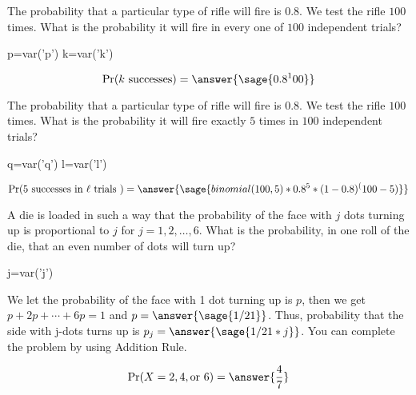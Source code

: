 \documentclass{ximera}
\begin{document}
\hspace{1cm}

\begin{problem}
The probability that a particular type of rifle will fire is $0.8$. We test the rifle $100$ times.
What is the probability it will fire in every one of $100$ independent trials? 

\begin{explanation}
\begin{sagesilent}
p=var('p')
k=var('k')
\end{sagesilent}
\begin{equation*} 
\Pr(k \text{ successes} ) = \answer{\sage{0.8^100}}
\end{equation*}

\end{explanation}
\end{problem}


\begin{problem}
The probability that a particular type of rifle will fire is $0.8$. We test the rifle $100$ times.
What is the probability it will fire exactly $5$ times in $100$ independent trials? 

\begin{explanation}
\begin{sagesilent}
q=var('q')
l=var('l')
\end{sagesilent}
\begin{equation*} 
\Pr(5 \text{ successes in  } \ell \text{ trials } ) = \answer{\sage{binomial(100,5)*0.8^5*(1-0.8)^(100-5)}} 
\end{equation*}
\end{explanation}
\end{problem}



\begin{problem}
A die is loaded in such a way that the probability of the face with $j$ dots turning up is proportional to $j$ for $j = 1,2, \ldots,6$. What is the probability, in one roll of the die, that an even number of dots will turn up? 
\begin{hint}
\begin{sagesilent}
j=var('j')
\end{sagesilent}
We let the probability of the face with 1 dot turning up is $p$,
then we get $p+2p+\cdots+6p=1$ and $p=\answer{\sage{1/21}}$.
Thus, probability that the side with j-dots turns up is $p_j =\answer{\sage{1/21*j}}$.
You can complete the problem by using Addition Rule.
\end{hint}

\begin{prompt}
\begin{equation*}
\Pr(X=2, 4, \text{or } 6 ) =%
\answer{\frac{4}{7}}
\end{equation*}

\end{prompt}
\end{problem}
\end{document}
